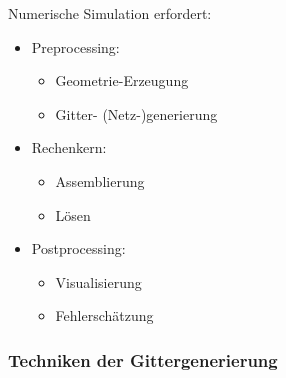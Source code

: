 Numerische Simulation erfordert:

\begin{itemize}
    \item
      Preprocessing:
      \begin{itemize}
          \item
            Geometrie-Erzeugung
          \item
            Gitter- (Netz-)generierung
      \end{itemize}
    \item
      Rechenkern:
      \begin{itemize}
          \item
            Assemblierung
          \item
            Lösen
      \end{itemize}
    \item
      Postprocessing:
      \begin{itemize}
          \item
            Visualisierung
          \item
            Fehlerschätzung
      \end{itemize}
\end{itemize}


\subsubsection{Techniken der Gittergenerierung}


